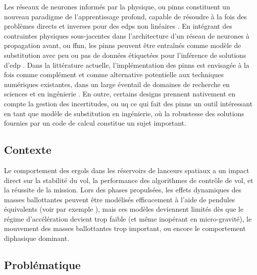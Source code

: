 \documentclass[12pt]{article}
\begin{document}
	Les réseaux de neurones informés par la physique, ou \glspl{pinn} constituent un nouveau paradigme de l’apprentissage profond, capable de résoudre à la fois des problèmes directs et inverses pour des \glspl{edp} non linéaires \cite{raissiPhysicsinformedNeuralNetworks2019}. En intégrant des contraintes physiques sous-jacentes dans l’architecture d’un réseau de neurones à propagation avant, ou \gls{ffnn}, les \glspl{pinn} peuvent être entraînés comme modèle de substitution avec peu ou pas de données étiquetées pour l’inférence de solutions d’\gls{edp} \cite{cuomoScientificMachineLearning2022}. Dans la littérature actuelle, l’implémentation des \glspl{pinn} est envisagée à la fois comme complément et comme alternative potentielle aux techniques numériques existantes, dans un large éventail de domaines de recherche en sciences et en ingénierie \cite{maoPhysicsinformedNeuralNetworks2020,buosoPersonalisingLeftventricularBiophysical2021, caiPhysicsInformedNeuralNetworks2021}.
	En outre, certains designs prennent nativement en compte la gestion des incertitudes, ou \gls{uq} \cite{yangBPINNsBayesianPhysicsInformed2021,zhangQuantifyingTotalUncertainty2018} ce qui fait des \glspl{pinn} un outil intéressant en tant que modèle de substitution en ingénierie, où la robustesse des solutions fournies par un code de calcul constitue un sujet important.
	
	\subsection*{Contexte}
	
	
	Le comportement des ergols dans les réservoirs de lanceurs spatiaux a un impact direct sur la stabilité du vol, la performance des algorithmes de contrôle de vol, et la réussite de la mission. Lors des phases propulsées, les effets dynamiques des masses ballottantes peuvent être modélisés efficacement à l'aide de pendules équivalents (voir par exemple \cite{ibrahimLiquidSloshingDynamics2005a}), mais ces modèles deviennent limités dès que le régime d’accélération devient trop faible (et même inopérant en micro-gravité), le mouvement des masses ballottantes trop important, ou encore le comportement diphasique dominant.
	
	\subsection*{Problématique}
	
\end{document}
